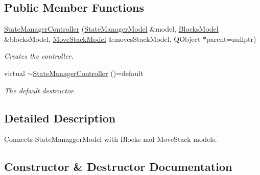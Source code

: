 \subsection*{Public Member Functions}
\begin{DoxyCompactItemize}
\item 
\mbox{\hyperlink{class_state_manager_controller_a5c85e4844ad71a69c615bf3278956cda}{State\+Manager\+Controller}} (\mbox{\hyperlink{class_state_manager_model}{State\+Manager\+Model}} \&model, \mbox{\hyperlink{class_blocks_model}{Blocks\+Model}} \&blocks\+Model, \mbox{\hyperlink{class_move_stack_model}{Move\+Stack\+Model}} \&moves\+Stack\+Model, Q\+Object $\ast$parent=nullptr)
\begin{DoxyCompactList}\small\item\em Creates the controller. \end{DoxyCompactList}\item 
virtual \mbox{\hyperlink{class_state_manager_controller_a9fc558b48688774b9690edd208ee5797}{$\sim$\+State\+Manager\+Controller}} ()=default
\begin{DoxyCompactList}\small\item\em The default destructor. \end{DoxyCompactList}\end{DoxyCompactItemize}


\subsection{Detailed Description}
Connects State\+Managger\+Model with Blocks nad Move\+Stack models. 



\subsection{Constructor \& Destructor Documentation}
\mbox{\label{class_state_manager_controller_a5c85e4844ad71a69c615bf3278956cda}} 
